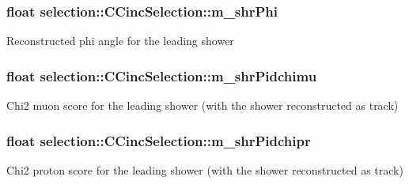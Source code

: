 \subsubsection[{\texorpdfstring{m\+\_\+shr\+Phi}{m_shrPhi}}]{\setlength{\rightskip}{0pt plus 5cm}float selection\+::\+C\+Cinc\+Selection\+::m\+\_\+shr\+Phi\hspace{0.3cm}{\ttfamily [private]}}\hypertarget{classselection_1_1CCincSelection_ac71dc01edcb5f8f636c802755f4cfb14}{}\label{classselection_1_1CCincSelection_ac71dc01edcb5f8f636c802755f4cfb14}
Reconstructed phi angle for the leading shower 
\subsubsection[{\texorpdfstring{m\+\_\+shr\+Pidchimu}{m_shrPidchimu}}]{\setlength{\rightskip}{0pt plus 5cm}float selection\+::\+C\+Cinc\+Selection\+::m\+\_\+shr\+Pidchimu\hspace{0.3cm}{\ttfamily [private]}}\hypertarget{classselection_1_1CCincSelection_a01f6b4b35c15cf072e082eee58665bd0}{}\label{classselection_1_1CCincSelection_a01f6b4b35c15cf072e082eee58665bd0}
Chi2 muon score for the leading shower (with the shower reconstructed as track) 
\subsubsection[{\texorpdfstring{m\+\_\+shr\+Pidchipr}{m_shrPidchipr}}]{\setlength{\rightskip}{0pt plus 5cm}float selection\+::\+C\+Cinc\+Selection\+::m\+\_\+shr\+Pidchipr\hspace{0.3cm}{\ttfamily [private]}}\hypertarget{classselection_1_1CCincSelection_a23975eb02710fef71c363a9dd8ed808b}{}\label{classselection_1_1CCincSelection_a23975eb02710fef71c363a9dd8ed808b}
Chi2 proton score for the leading shower (with the shower reconstructed as track) 
